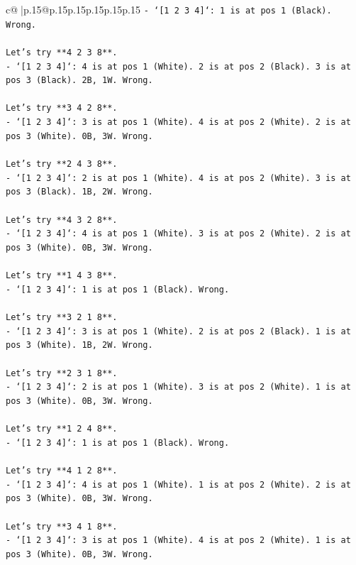 \documentclass{article}
\begin{document}
{\begin{supertabular}{c@{$\;$}|p{.15\linewidth}@{}p{.15\linewidth}p{.15\linewidth}p{.15\linewidth}p{.15\linewidth}p{.15\linewidth}}
{{{\texttt{{-} `{[}1 2 3 4{]}`: 1 is at pos 1 (Black). Wrong.} \\
\\ 
\texttt{Let's try **4 2 3 8**.} \\
\texttt{{-} `{[}1 2 3 4{]}`: 4 is at pos 1 (White). 2 is at pos 2 (Black). 3 is at pos 3 (Black). 2B, 1W. Wrong.} \\
\\ 
\texttt{Let's try **3 4 2 8**.} \\
\texttt{{-} `{[}1 2 3 4{]}`: 3 is at pos 1 (White). 4 is at pos 2 (White). 2 is at pos 3 (White). 0B, 3W. Wrong.} \\
\\ 
\texttt{Let's try **2 4 3 8**.} \\
\texttt{{-} `{[}1 2 3 4{]}`: 2 is at pos 1 (White). 4 is at pos 2 (White). 3 is at pos 3 (Black). 1B, 2W. Wrong.} \\
\\ 
\texttt{Let's try **4 3 2 8**.} \\
\texttt{{-} `{[}1 2 3 4{]}`: 4 is at pos 1 (White). 3 is at pos 2 (White). 2 is at pos 3 (White). 0B, 3W. Wrong.} \\
\\ 
\texttt{Let's try **1 4 3 8**.} \\
\texttt{{-} `{[}1 2 3 4{]}`: 1 is at pos 1 (Black). Wrong.} \\
\\ 
\texttt{Let's try **3 2 1 8**.} \\
\texttt{{-} `{[}1 2 3 4{]}`: 3 is at pos 1 (White). 2 is at pos 2 (Black). 1 is at pos 3 (White). 1B, 2W. Wrong.} \\
\\ 
\texttt{Let's try **2 3 1 8**.} \\
\texttt{{-} `{[}1 2 3 4{]}`: 2 is at pos 1 (White). 3 is at pos 2 (White). 1 is at pos 3 (White). 0B, 3W. Wrong.} \\
\\ 
\texttt{Let's try **1 2 4 8**.} \\
\texttt{{-} `{[}1 2 3 4{]}`: 1 is at pos 1 (Black). Wrong.} \\
\\ 
\texttt{Let's try **4 1 2 8**.} \\
\texttt{{-} `{[}1 2 3 4{]}`: 4 is at pos 1 (White). 1 is at pos 2 (White). 2 is at pos 3 (White). 0B, 3W. Wrong.} \\
\\ 
\texttt{Let's try **3 4 1 8**.} \\
\texttt{{-} `{[}1 2 3 4{]}`: 3 is at pos 1 (White). 4 is at pos 2 (White). 1 is at pos 3 (White). 0B, 3W. Wrong.} \\
}}}
\end{supertabular}}
\end{document}
